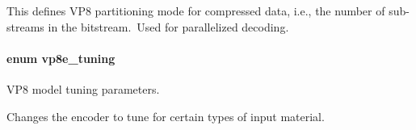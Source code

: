 \-This defines \-V\-P8 partitioning mode for compressed data, i.\-e., the number of sub-\/streams in the bitstream.\- \-Used for parallelized decoding. \hypertarget{group__vp8__encoder_ga371dbc29054b3d46364af996ad42ab94}{
\paragraph[{vp8e\-\_\-tuning}]{\setlength{\rightskip}{0pt plus 5cm}enum {\bf vp8e\-\_\-tuning}}}
\label{group__vp8__encoder_ga371dbc29054b3d46364af996ad42ab94}


\-V\-P8 model tuning parameters. 

\-Changes the encoder to tune for certain types of input material. 